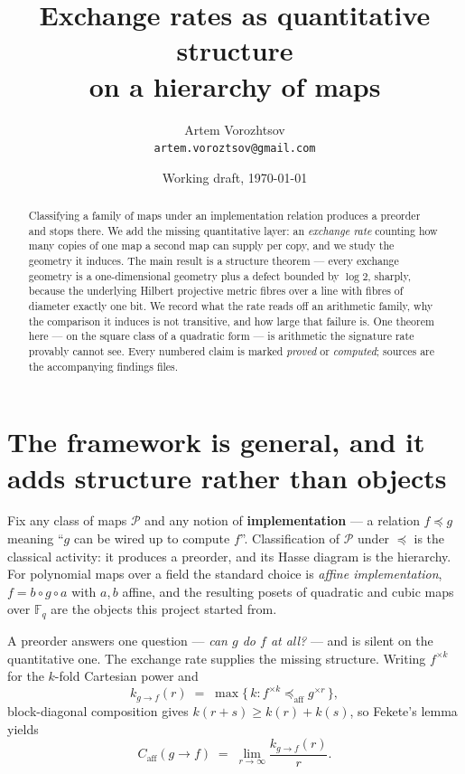 \documentclass[11pt]{article}
\title{Exchange rates as quantitative structure\\on a hierarchy of maps}
\author{Artem Vorozhtsov\\
\small\texttt{artem.voroztsov@gmail.com}}
\date{Working draft, \today}
\theoremstyle{plain}
\theoremstyle{remark}
\newcommand{\F}{\mathbb F}
\newcommand{\impl}{\preccurlyeq}
\newcommand{\caff}{C_{\mathrm{aff}}}
\newcommand{\ra}{\rightarrow}
\begin{document}
\maketitle

\begin{abstract}
Classifying a family of maps under an implementation relation produces a
preorder and stops there.  We add the missing quantitative layer: an
\emph{exchange rate} counting how many copies of one map a second map can
supply per copy, and we study the geometry it induces.  The main result is a
structure theorem --- every exchange geometry is a one-dimensional geometry plus
a defect bounded by $\log 2$, sharply, because the underlying Hilbert projective
metric fibres over a line with fibres of diameter exactly one bit.  We record
what the rate reads off an arithmetic family, why the comparison it induces is
not transitive, and how large that failure is.  One theorem here --- on the
square class of a quadratic form --- is arithmetic the signature rate provably
cannot see.  Every numbered claim is marked
\emph{proved} or \emph{computed}; sources are the accompanying findings files.
\end{abstract}

\section{The framework is general, and it adds structure rather than objects}

Fix any class of maps $\mathcal P$ and any notion of \textbf{implementation} ---
a relation $f \impl g$ meaning ``$g$ can be wired up to compute $f$''.
Classification of $\mathcal P$ under $\impl$ is the classical activity: it
produces a preorder, and its Hasse diagram is the hierarchy.  For polynomial
maps over a field the standard choice is \emph{affine implementation},
$f = b \circ g \circ a$ with $a,b$ affine, and the resulting posets of quadratic
and cubic maps over $\F_q$ are the objects this project started from.

A preorder answers one question --- \emph{can $g$ do $f$ at all?} --- and is
silent on the quantitative one.  The exchange rate supplies the missing
structure.  Writing $f^{\times k}$ for the $k$-fold Cartesian power and
\[
  k_{g\ra f}(r) \;=\; \max\{\,k : f^{\times k} \impl_{\mathrm{aff}} g^{\times r}\,\},
\]
block-diagonal composition gives $k(r+s) \ge k(r) + k(s)$, so Fekete's lemma
yields
\begin{equation}\label{eq:caff}
  \caff(g\ra f) \;=\; \lim_{r\to\infty} \frac{k_{g\ra f}(r)}{r}.
\end{equation}
\end{document}
